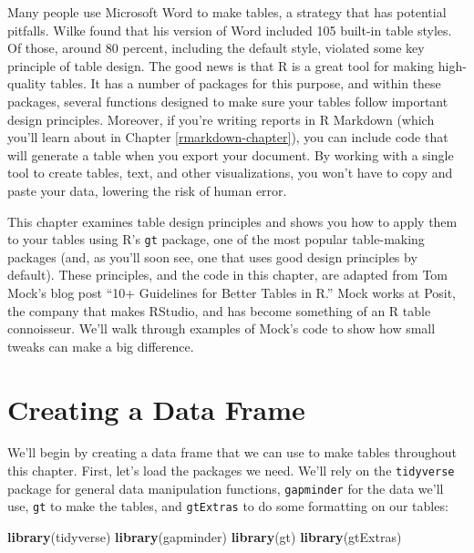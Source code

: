 \documentclass[
]{book}
\newenvironment{Shaded}{\begin{snugshade}}{\end{snugshade}}
\newcommand{\FunctionTok}[1]{\textcolor[rgb]{0.13,0.29,0.53}{\textbf{#1}}}
\newcommand{\NormalTok}[1]{#1}
\begin{document}
Many people use Microsoft Word to make tables, a strategy that has potential pitfalls. Wilke found that his version of Word included 105 built-in table styles. Of those, around 80 percent, including the default style, violated some key principle of table design. The good news is that R is a great tool for making high-quality tables. It has a number of packages for this purpose, and within these packages, several functions designed to make sure your tables follow important design principles.
Moreover, if you're writing reports in R Markdown (which you'll learn about in Chapter \ref{rmarkdown-chapter}), you can include code that will generate a table when you export your document. By working with a single tool to create tables, text, and other visualizations, you won't have to copy and paste your data, lowering the risk of human error.

This chapter examines table design principles and shows you how to apply them to your tables using R's \texttt{gt} package, one of the most popular table-making packages (and, as you'll soon see, one that uses good design principles by default). These principles, and the code in this chapter, are adapted from Tom Mock's blog post ``10+ Guidelines for Better Tables in R.'' Mock works at Posit, the company that makes RStudio, and has become something of an R table connoisseur. We'll walk through examples of Mock's code to show how small tweaks can make a big difference.

\hypertarget{creating-a-data-frame}{%
\section*{Creating a Data Frame}\label{creating-a-data-frame}}

We'll begin by creating a data frame that we can use to make tables throughout this chapter. First, let's load the packages we need. We'll rely on the \texttt{tidyverse} package for general data manipulation functions, \texttt{gapminder} for the data we'll use, \texttt{gt} to make the tables, and \texttt{gtExtras} to do some formatting on our tables:

\begin{Shaded}
\begin{Highlighting}[]
\FunctionTok{library}\NormalTok{(tidyverse)}
\FunctionTok{library}\NormalTok{(gapminder)}
\FunctionTok{library}\NormalTok{(gt)}
\FunctionTok{library}\NormalTok{(gtExtras)}
\end{Highlighting}
\end{Shaded}
\end{document}
